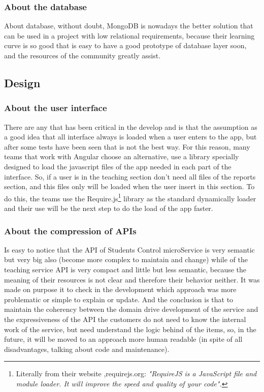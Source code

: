 \subsubsection{About the database}

About database, without doubt, MongoDB is nowadays the better solution that
can be used in a project with low relational requirements, because their learning
curve is so good that is easy to have a good prototype of database layer soon,
and the resources of the community greatly assist.

\subsection {Design}

\subsubsection{About the user interface}

There are any that has been critical in the develop and is that the assumption
as a good idea that all interface always is loaded when a user enters to the app,
but after some tests have been seen that is not the best way.  For this reason,
many teams that work with Angular choose an alternative, use a library specially
designed to load the javascript files of the app needed in each part of the interface.
\intro
So, if a user is in the teaching section don't need all files of the reports section, and this files only will be loaded when the user insert in this section. To do this,
the teams use the Require.js\footnote{Literally from their website ,requirejs.org: \textit{"RequireJS is a
JavaScript file and module loader. It will improve the speed and quality of your code".}} library as
the standard dynamically loader and their use will be the next step to do the
load of the app faster.
\subsubsection{About the compression of APIs}

Is easy to notice that the API of Students Control microService is very semantic
but very big also (become more complex to maintain and change) while of the
teaching service API is very compact and little but less semantic, because the
meaning of their resources is not clear and therefore their behavior neither.
It was made on purpose it to check in the development which approach was more
problematic or simple to explain or update.
\intro
And the conclusion is that to maintain the coherency between the domain drive
development of the service and the expressiveness of the API the customers do not
need to know the internal work of the service, but need understand the logic
behind of the items, so, in the future, it will be moved to an approach more human
readable (in spite of all disadvantages, talking about code and maintenance).

